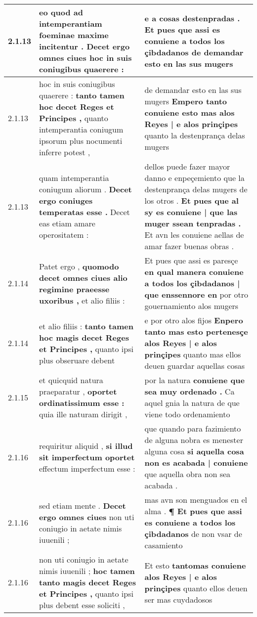 \begin{tabular}{|p{1cm}|p{6.5cm}|p{6.5cm}|}
2.1.13 & eo quod ad intemperantiam foeminae maxime incitentur . \textbf{ Decet ergo omnes ciues } hoc in suis coniugibus quaerere : & e a cosas destenpradas . \textbf{ Et pues que assi es conuiene a todos los çibdadanos } de demandar esto en las sus mugers \\\hline
2.1.13 & hoc in suis coniugibus quaerere : \textbf{ tanto tamen hoc decet Reges et Principes , } quanto intemperantia coniugum ipsorum plus nocumenti inferre potest , & de demandar esto en las sus mugers \textbf{ Empero tanto conuiene esto mas alos Reyes | e alos prinçipes } quanto la destenprança delas mugers \\\hline
2.1.13 & quam intemperantia coniugum aliorum . \textbf{ Decet ergo coniuges temperatas esse . } Decet eas etiam amare operositatem : & dellos puede fazer mayor danno e enpeçemiento que la destenprança delas mugers de los otros . \textbf{ Et pues que al sy es conuiene | que las muger ssean tenpradas . } Et avn les conuiene aellas de amar fazer buenas obras . \\\hline
2.1.14 & Patet ergo , \textbf{ quomodo decet omnes ciues alio regimine praeesse uxoribus , } et alio filiis : & Et pues que assi es paresçe \textbf{ en qual manera conuiene a todos los çibdadanos | que enssennore en } por otro gouernamiento alos mugers \\\hline
2.1.14 & et alio filiis : \textbf{ tanto tamen hoc magis decet Reges et Principes , } quanto ipsi plus obseruare debent & e por otro alos fijos \textbf{ Enpero tanto mas esto pertenesçe alos Reyes | e alos prinçipes } quanto mas ellos deuen guardar aquellas cosas \\\hline
2.1.15 & et quicquid natura praeparatur , \textbf{ oportet ordinatissimum esse : } quia ille naturam dirigit , & por la natura \textbf{ conuiene que sea muy ordenado . } Ca aquel gnia la natura de que viene todo ordenamiento \\\hline
2.1.16 & requiritur aliquid , \textbf{ si illud sit imperfectum oportet } effectum imperfectum esse : & que quando para fazimiento de alguna nobra es menester alguna cosa \textbf{ si aquella cosa non es acabada | conuiene } que aquella obra non sea acabada . \\\hline
2.1.16 & sed etiam mente . \textbf{ Decet ergo omnes ciues } non uti coniugio in aetate nimis iuuenili ; & mas avn son menguados en el alma . \textbf{ ¶ Et pues que assi es conuiene a todos los çibdadanos } de non vsar de casamiento \\\hline
2.1.16 & non uti coniugio in aetate nimis iuuenili ; \textbf{ hoc tamen tanto magis decet Reges et Principes , } quanto ipsi plus debent esse soliciti , & Et esto \textbf{ tantomas conuiene alos Reyes | e alos prinçipes } quanto ellos deuen ser mas cuydadosos \\\hline

\end{tabular}
